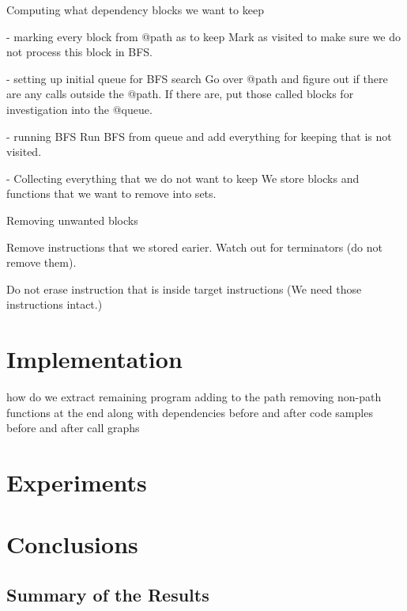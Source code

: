 \documentclass[12pt, twoside]{fithesis2}
\renewcommand{\_}{\leavevmode \kern0.07em\vbox{\hrule width0.4em}}
\begin{document}
Computing what dependency blocks we want to keep

- marking every block from @path as to keep
Mark as visited to make sure we do not process this block in BFS.

- setting up initial queue for BFS search
Go over @path and figure out if there are any calls outside the @path. If there
are, put those called blocks for investigation into the @queue.

- running BFS
Run BFS from queue and add everything for keeping that is not visited.

- Collecting everything that we do not want to keep
We store blocks and functions that we want to remove into sets.

Removing unwanted blocks

Remove instructions that we stored earier. Watch out for terminators (do not
remove them).

Do not erase instruction that is inside target instructions (We need those
instructions intact.)

\chapter{Implementation}
\label{chap:implementation}

\cite{llvm-writing-pass}
how do we extract remaining program
adding to the path
removing non-path functions at the end
along with dependencies
before and after code samples
before and after call graphs

\chapter{Experiments}
\label{chap:experiments}


\chapter{Conclusions}
\label{chap:conclusions}

\section{Summary of the Results}
\label{sec:conclusions-summary}
\end{document}
